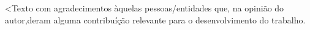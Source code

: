 \begin{agradecimentos}
<Texto com agradecimentos àquelas pessoas/entidades que, na opinião do autor,deram alguma contribuíção relevante para o desenvolvimento do trabalho.
\end{agradecimentos}


